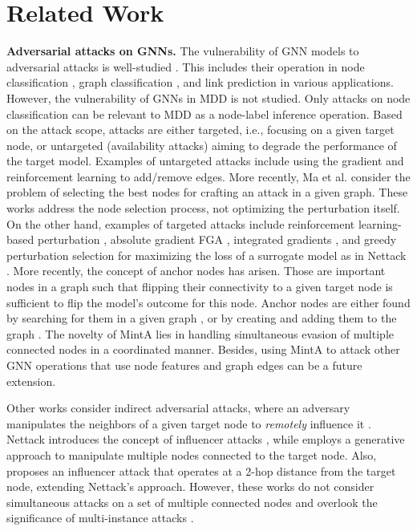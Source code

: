 \documentclass[conference,compsoc]{IEEEtran}
\begin{document}
\section{Related Work}
\label{Section6}
\par \textbf{Adversarial attacks on GNNs.} The vulnerability of GNN models to adversarial attacks is well-studied \cite{xu2020adversarial}. This includes their operation in node classification \cite{ma2019attacking}, graph classification \cite{zhang2021projective}, and link prediction \cite{bhardwaj2021poisoning} in various applications. However, the vulnerability of GNNs in MDD is not studied. Only attacks on node classification can be relevant to MDD as a node-label inference operation. Based on the attack scope, attacks are either targeted, i.e., focusing on a given target node, or untargeted (availability attacks) aiming to degrade the performance of the target model. Examples of untargeted attacks include using the gradient \cite{xu2019topology} and reinforcement learning \cite{ma2019attacking} to add/remove edges. More recently, Ma et al. \cite{ma2020towards,ma2022adversarial} consider the problem of selecting the best nodes for crafting an attack in a given graph. These works address the node selection process, not optimizing the perturbation itself. On the other hand, examples of targeted attacks include reinforcement learning-based perturbation \cite{dai2018adversarial}, absolute gradient FGA \cite{chen2018fast}, integrated gradients \cite{wu2019adversarial}, and greedy perturbation selection for maximizing the loss of a surrogate model as in Nettack \cite{zugner2018adversarial}. More recently, the concept of anchor nodes has arisen. Those are important nodes in a graph such that flipping their connectivity to a given target node is sufficient to flip the model’s outcome for this node. Anchor nodes are either found by searching for them in a given graph \cite{zang2020graph}, or by creating and adding them to the graph \cite{dai2022targeted,zang2023guap}. The novelty of MintA lies in handling simultaneous evasion of multiple connected nodes in a coordinated manner. Besides, using MintA to attack other GNN operations that use node features and graph edges can be a future extension. 

\par Other works consider indirect adversarial attacks, where an adversary manipulates the neighbors of a given target node to \textit{remotely} influence it \cite{zugner2018adversarial,chen2021graphattacker,takahashi2019indirect}. Nettack introduces the concept of influencer attacks \cite{zugner2018adversarial}, while \cite{chen2021graphattacker} employs a generative approach to manipulate multiple nodes connected to the target node. Also, \cite{takahashi2019indirect} proposes an influencer attack that operates at a 2-hop distance from the target node, extending Nettack's approach. However, these works do not consider simultaneous attacks on a set of multiple connected nodes and overlook the significance of multi-instance attacks \cite{takahashi2019indirect}.
\end{document}
